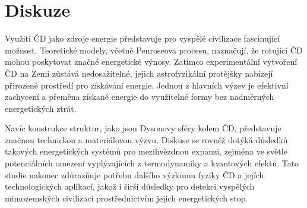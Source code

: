 \documentclass[
	a4paper, %
	10pt, %
	unnumberedsections, %
	twoside, %
]{LTJournalArticle}
\begin{document}

\section{Diskuze}

Využití ČD jako zdroje energie představuje pro vyspělé civilizace fascinující možnost. Teoretické modely, včetně Penroseova procesu, naznačují, že rotující ČD mohou poskytovat značné energetické výnosy. Zatímco experimentální vytvoření ČD na Zemi zůstává nedosažitelné, jejich astrofyzikální protějšky nabízejí přirozené prostředí pro získávání energie. Jednou z hlavních výzev je efektivní zachycení a přeměna získané energie do využitelné formy bez nadměrných energetických ztrát.

Navíc konstrukce struktur, jako jsou Dysonovy sféry kolem ČD, představuje značnou technickou a materiálovou výzvu. Diskuse se rovněž dotýká důsledků takových energetických systémů pro mezihvězdnou expanzi, zejména ve světle potenciálních omezení vyplývajících z termodynamiky a kvantových efektů. Tato studie nakonec zdůrazňuje potřebu dalšího výzkumu fyziky ČD a jejích technologických aplikací, jakož i širší důsledky pro detekci vyspělých mimozemských civilizací prostřednictvím jejich energetických stop.


\printbibliography %
\end{document}

